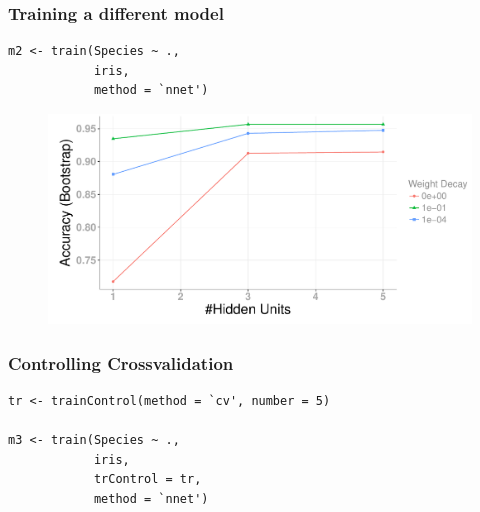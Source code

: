 \documentclass[handout, aspectratio = 169]{beamer}
\begin{document}
\begin{frame}[fragile]
\frametitle{Training a different model}
\renewcommand{\FancyVerbFormatLine}[1]{%
   \ifnum\value{FancyVerbLine}=3\color{cyan}#1%
   \else #1\fi}

\begin{Verbatim}
m2 <- train(Species ~ ., 
            iris,
            method = `nnet')
\end{Verbatim}

\begin{figure}
    \includegraphics[height = 0.5\textheight]{train_nnet}
\end{figure} 
\end{frame} 




\begin{frame}[fragile]
\frametitle{Controlling Crossvalidation}
\renewcommand{\FancyVerbFormatLine}[1]{%
   \ifnum\value{FancyVerbLine}=1\color{cyan}#1%
   \else #1\fi}

\begin{Verbatim}
tr <- trainControl(method = `cv', number = 5)

m3 <- train(Species ~ ., 
            iris,
            trControl = tr,
            method = `nnet')
\end{Verbatim}

\end{frame} 
\end{document}
